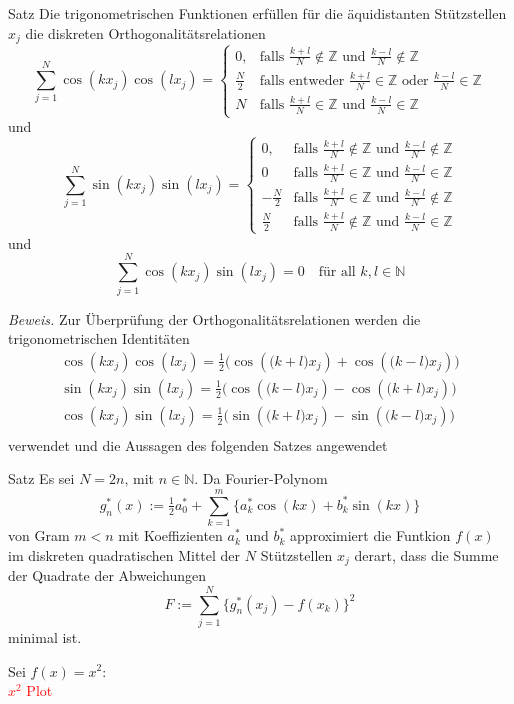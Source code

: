 \begin{thmbox}{Satz}
    Die trigonometrischen Funktionen erfüllen für die äquidistanten Stützstellen $x_j$ die diskreten Orthogonalitätsrelationen
    \[
        \sum_{j=1}^{N} \cos(kx_j)\cos(lx_j) = \begin{cases}
            0, &\text{falls } \tfrac{k+l}{N}\notin \mathbb{Z} \text{ und } \tfrac{k-l}{N}\notin \mathbb{Z} \\
            \tfrac{N}{2} &\text{falls entweder } \tfrac{k+l}{N}\in \mathbb{Z} \text{ oder } \tfrac{k-l}{N}\in \mathbb{Z} \\
            N &\text{falls } \tfrac{k+l}{N}\in \mathbb{Z} \text{ und } \tfrac{k-l}{N}\in \mathbb{Z}
        \end{cases}
    \]
    und 
    \[
        \sum_{j=1}^{N} \sin(kx_j)\sin(lx_j) = \begin{cases}
            0, &\text{falls } \tfrac{k+l}{N}\notin \mathbb{Z} \text{ und } \tfrac{k-l}{N}\notin \mathbb{Z} \\
            0 &\text{falls } \tfrac{k+l}{N}\in \mathbb{Z} \text{ und } \tfrac{k-l}{N}\in \mathbb{Z} \\
            -\tfrac{N}{2} &\text{falls } \tfrac{k+l}{N}\in \mathbb{Z} \text{ und } \tfrac{k-l}{N}\notin \mathbb{Z} \\
            \tfrac{N}{2} &\text{falls } \tfrac{k+l}{N}\notin \mathbb{Z} \text{ und } \tfrac{k-l}{N}\in \mathbb{Z}
        \end{cases}
    \]
    und 
    \[
        \sum_{j=1}^{N} \cos(kx_j)\sin(lx_j) = 0 \quad \text{für all } k,l\in\mathbb{N}
    \]
\end{thmbox}
\textit{Beweis.} Zur Überprüfung der Orthogonalitätsrelationen werden die trigonometrischen Identitäten
\begin{align*}
    \cos(kx_j)\cos(lx_j) = \tfrac{1}{2}\Big(\cos(\big(k+l\big)x_j) + \cos(\big(k-l\big)x_j)\Big) \\
    \sin(kx_j)\sin(lx_j) = \tfrac{1}{2}\Big(\cos(\big(k-l\big)x_j) - \cos(\big(k+l\big)x_j)\Big) \\
    \cos(kx_j)\sin(lx_j) = \tfrac{1}{2}\Big(\sin(\big(k+l\big)x_j) - \sin(\big(k-l\big)x_j)\Big) \\
\end{align*}
verwendet und die Aussagen des folgenden Satzes angewendet
\begin{thmbox}{Satz}
    Es sei $N=2n$, mit $n\in\mathbb{N}$. Da Fourier-Polynom
    \[
    g_n^*(x) := \tfrac{1}{2}a^*_0 + \sum_{k=1}^{m}\{a^*_k\cos(kx)+b^*_k\sin(kx)\}
    \]
    von Gram $m<n$ mit Koeffizienten $a_k^*$ und $b^*_k$ approximiert die Funtkion $f(x)$ im diskreten quadratischen 
    Mittel der $N$ Stützstellen $x_j$ derart, dass die Summe der Quadrate der Abweichungen
    \[
    F:=\sum_{j=1}^{N}\{g^*_n(x_j)-f(x_k)\}^2
    \]
    minimal ist.
\end{thmbox}
\begin{egbox}
    Sei $f(x)=x^2$: \\
    \textcolor{red}{$x^2$ Plot} 
\end{egbox}


